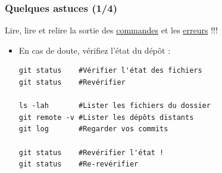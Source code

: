 \documentclass[table,tikz,12pt,svgnames]{beamer}
\begin{document}
\begin{frame}[fragile]
\frametitle{Quelques astuces (1/4)}
\vspace{-1em}
\begin{block}{}


\begin{adjustwidth}{-1em}{0cm}
\begin{center}
{\huge \color{red}Lire, lire et relire la sortie des \underline{commandes} et les \underline{erreurs} !!!}
\end{center}
\end{adjustwidth}

\PAUSE

\begin{itemize}
\vspace{1em}
\item En cas de doute, vérifiez l'état du dépôt :
\begin{verbatim}
git status    #Vérifier l'état des fichiers
git status    #Revérifier

ls -lah       #Lister les fichiers du dossier
git remote -v #Lister les dépôts distants
git log       #Regarder vos commits

git status    #Revérifier l'état !
git status    #Re-revérifier
\end{verbatim}
\end{itemize}
\end{block}
\end{frame}
\end{document}

